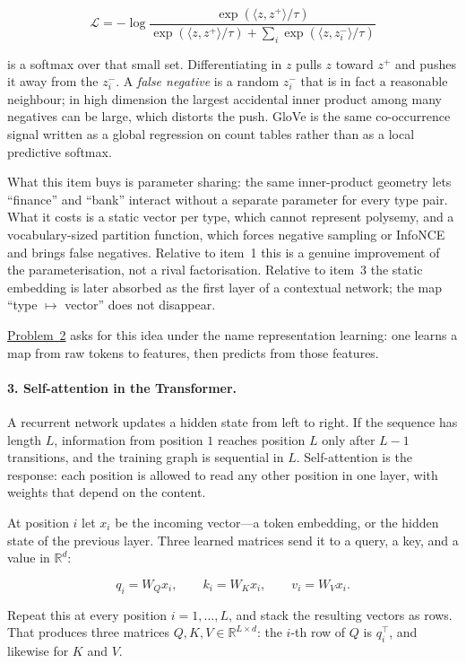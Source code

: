 \documentclass[11pt,a4paper]{article}
\newcommand{\jump}[2]{\hyperref[#1]{#2}}
\theoremstyle{definition}
\begin{document}
\[
\mathcal{L}
=-\log\frac{\exp(\langle z,z^+\rangle/\tau)}{\exp(\langle z,z^+\rangle/\tau)+\sum_i\exp(\langle z,z_i^-\rangle/\tau)}
\]

is a softmax over that small set. Differentiating in \(z\) pulls \(z\) toward \(z^+\) and pushes it away from the \(z_i^-\). A \emph{false negative} is a random \(z_i^-\) that is in fact a reasonable neighbour; in high dimension the largest accidental inner product among many negatives can be large, which distorts the push. GloVe is the same co-occurrence signal written as a global regression on count tables rather than as a local predictive softmax.

What this item buys is parameter sharing: the same inner-product geometry lets ``finance'' and ``bank'' interact without a separate parameter for every type pair. What it costs is a static vector per type, which cannot represent polysemy, and a vocabulary-sized partition function, which forces negative sampling or InfoNCE and brings false negatives. Relative to item~1 this is a genuine improvement of the parameterisation, not a rival factorisation. Relative to item~3 the static embedding is later absorbed as the first layer of a contextual network; the map ``type \(\mapsto\) vector'' does not disappear.

\jump{prob:spr2025-nlp-2}{Problem~2} asks for this idea under the name representation learning: one learns a map from raw tokens to features, then predicts from those features.

\paragraph{3. Self-attention in the Transformer.}
A recurrent network updates a hidden state from left to right. If the sequence has length \(L\), information from position \(1\) reaches position \(L\) only after \(L-1\) transitions, and the training graph is sequential in \(L\). Self-attention is the response: each position is allowed to read any other position in one layer, with weights that depend on the content.

At position \(i\) let \(x_i\) be the incoming vector---a token embedding, or the hidden state of the previous layer. Three learned matrices send it to a query, a key, and a value in \(\mathbb{R}^d\):

\[
q_i=W_Q x_i,
\qquad
k_i=W_K x_i,
\qquad
v_i=W_V x_i.
\]

Repeat this at every position \(i=1,\ldots,L\), and stack the resulting vectors as rows. That produces three matrices \(Q,K,V\in\mathbb{R}^{L\times d}\): the \(i\)-th row of \(Q\) is \(q_i^\top\), and likewise for \(K\) and \(V\).
\end{document}
